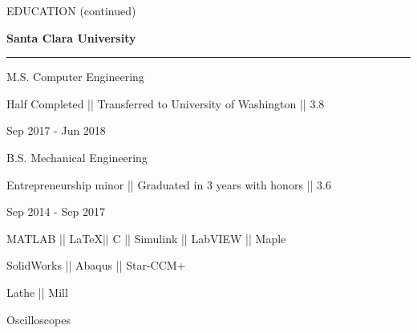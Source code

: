 \vspace{-1.4ex}
{\hspace{-1.73in}\noindent\color{cblue} {EDUCATION (continued)} }

\vspace{1.4ex}
{\hspace{-1.72in}\textbf{Santa Clara University}}{}{}

\vspace{-5.5ex}
{\hspace{-1.73in}\noindent\color{dblue}\rule{6.935in}{0.4pt}} %

{{\small M.S. Computer Engineering }}
\begin{detail}
\BulletItem
Half Completed || Transferred to University of Washington || 3.8
\end{detail}

\begin{subtitle}
\vspace{-8ex}
{{Sep 2017 - Jun 2018}}
\end{subtitle}

\vspace{1ex}

{{\small B.S. Mechanical Engineering}}
\begin{detail}
\BulletItem
Entrepreneurship minor || Graduated in 3 years with honors || 3.6
\end{detail}

\begin{subtitle}
\vspace{-8ex}
{{Sep 2014 - Sep 2017}}
\end{subtitle}

{
\vspace{1.5ex}
\color{cyan}\small
{MATLAB || \LaTeX || C || Simulink || LabVIEW || Maple} %
}

{
\vspace{-2.5ex}\hspace{3.17in}
\color{cyan}\small
{SolidWorks || Abaqus || Star-CCM+} %
}

{
\vspace{-0.5ex}
\color{cyan}\small
{Lathe || Mill} %
}

{
\vspace{-2.5ex}\hspace{3.17in}
\color{cyan}\small
{Oscilloscopes} %
}

